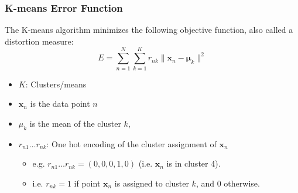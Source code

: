 \subsubsection{K-means Error Function}
\begin{definition}
    The K-means algorithm minimizes the following objective function, also called a distortion measure:
    \begin{equation}
        E = \sum_{n=1}^{N} \sum_{k=1}^{K} r_{nk} \| \mathbf{x}_n - \mathbf{\mu}_k \|^2
    \end{equation}
    \begin{itemize}
        \item $K$: Clusters/means
        \item \( \mathbf{x}_n \) is the data point \( n \)
        \item \( \mu_k \) is the mean of the cluster \( k \),
        \item $r_{n1}\ldots r_{nk}$: One hot encoding of the cluster assignment of $\mathbf{x}_n$
        \begin{itemize}
            \item e.g. $r_{n1}\ldots r_{nk} = (0,0,0,1,0)$ (i.e. $\mathbf{x}_n$ is in cluster 4).
            \item i.e.  \( r_{nk} = 1 \) if point \( \mathbf{x}_n \) is assigned to cluster \( k \), and 0 otherwise.
        \end{itemize}
    \end{itemize}
\end{definition}
    
